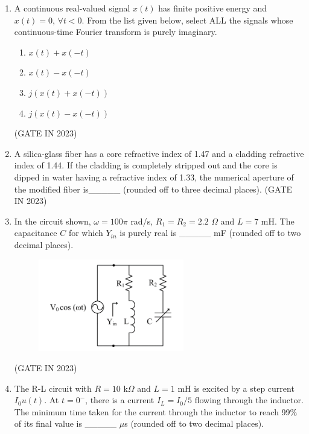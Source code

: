 \documentclass[journal]{IEEEtran}
\begin{document}
\begin{enumerate}
    \item A continuous real-valued signal $x(t)$ has finite positive energy and $x(t) = 0$, $\forall t < 0$. From the list given below, select ALL the signals whose continuous-time Fourier transform is purely imaginary.
    
    \begin{enumerate}
        \item $x(t) + x(-t)$
        \item $x(t) - x(-t)$
        \item $j(x(t) + x(-t))$
        \item $j(x(t) - x(-t))$
    \end{enumerate}
    \hfill(GATE IN 2023)

    \item A silica-glass fiber has a core refractive index of 1.47 and a cladding refractive index of 1.44. If the cladding is completely stripped out and the core is dipped in water having a refractive index of 1.33, the numerical aperture of the modified fiber is\_\_\_\_\_ (rounded off to three decimal places).
\hfill(GATE IN 2023)
    \item In the circuit shown, $\omega = 100\pi$ rad/s, $R_1 = R_2 = 2.2$ $\Omega$ and $L = 7$ mH. The capacitance $C$ for which $Y_{in}$ is purely real is \_\_\_\_\_ mF (rounded off to two decimal places).
    \begin{figure}[H]
    \centering
      \includegraphics[width=0.6\textwidth]{23.png} 
      \caption{}
    \label{fig:fig23} 
\end{figure}
\hfill(GATE IN 2023)
    \item The R-L circuit with $R = 10$ k$\Omega$ and $L = 1$ mH is excited by a step current $I_0 u(t)$. At $t = 0^-$, there is a current $I_L = I_0/5$ flowing through the inductor. The minimum time taken for the current through the inductor to reach 99\% of its final value is \_\_\_\_\_ $\mu$s (rounded off to two decimal places).
    \begin{figure}[H]
    \centering

\end{figure}
\end{enumerate}
\end{document}
